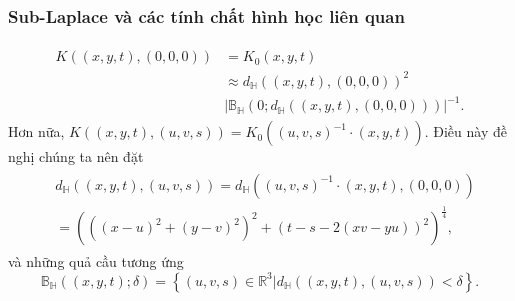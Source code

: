 \documentclass[11pt]{beamer}
\numberwithin{equation}{section}
\theoremstyle{plain}
\theoremstyle{definition}
\theoremstyle{remark}
\begin{document}
\begin{frame}\frametitle{Sub-Laplace và các tính chất hình học liên quan}
\begin{eqnarray*}
\begin{split}
K\left( {\left( {x,y,t} \right),\left( {0,0,0} \right)} \right) &= {K_0}\left( {x,y,t} \right)\\
 &\approx {d_\mathbb{H}}{\left( {\left( {x,y,t} \right),\left( {0,0,0} \right)} \right)^2}\\
 &{\left| {{\mathbb{B}_\mathbb{H}}\left( {0;{d_\mathbb{H}}\left( {\left( {x,y,t} \right),\left( {0,0,0} \right)} \right)} \right)} \right|^{ - 1}}.
\end{split}
\end{eqnarray*}
Hơn nữa, $K\left( {\left( {x,y,t} \right),\left( {u,v,s} \right)} \right) = {K_0}\left( {{{\left( {u,v,s} \right)}^{ - 1}} \cdot \left( {x,y,t} \right)} \right)$. Điều này đề nghị chúng ta nên đặt
\begin{eqnarray*}
\begin{split}
&{d_\mathbb{H}}\left( {\left( {x,y,t} \right),\left( {u,v,s} \right)} \right) = {d_\mathbb{H}}\left( {{{\left( {u,v,s} \right)}^{ - 1}} \cdot \left( {x,y,t} \right),\left( {0,0,0} \right)} \right)\\
 &= {\left( {{{\left( {{{\left( {x - u} \right)}^2} + {{\left( {y - v} \right)}^2}} \right)}^2} + {{\left( {t - s - 2\left( {xv - yu} \right)} \right)}^2}} \right)^{\frac{1}{4}}},
\end{split}
\end{eqnarray*}
và những quả cầu tương ứng
\[{\mathbb{B}_\mathbb{H}}\left( {\left( {x,y,t} \right);\delta } \right) = \left\{ {\left( {u,v,s} \right) \in {\mathbb{R}^3}|{d_\mathbb{H}}\left( {\left( {x,y,t} \right),\left( {u,v,s} \right)} \right) < \delta } \right\}.\]
\end{frame}
\end{document}
